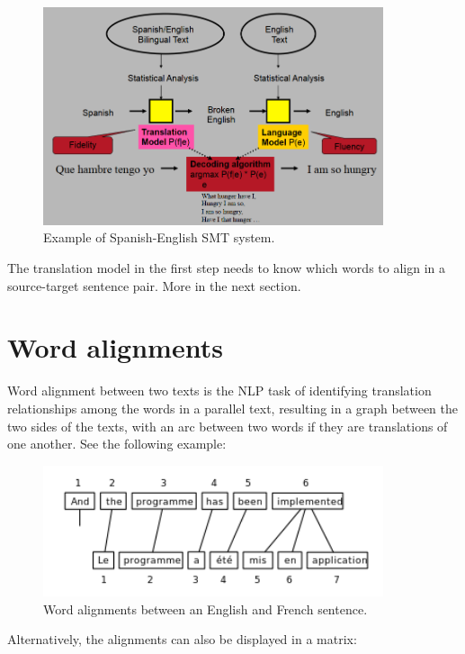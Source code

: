 \begin{figure}[!ht]
    \centering
    \includegraphics[width=10cm]{figures/smt.png}
    \caption{Example of Spanish-English SMT system.}
\end{figure}

The translation model in the first step needs to know which words to align in a source-target sentence pair. More in the next section.

\section{Word alignments}

Word alignment between two texts is the NLP task of identifying translation relationships among the words in a parallel text, resulting in a graph between the two sides of the texts, with an arc between two words if they are translations of one another. See the following example:

\begin{figure}[!ht]
    \centering
    \includegraphics[width=10cm]{figures/word_align.png}
    \caption{Word alignments between an English and French sentence.}
\end{figure}

Alternatively, the alignments can also be displayed in a matrix:

